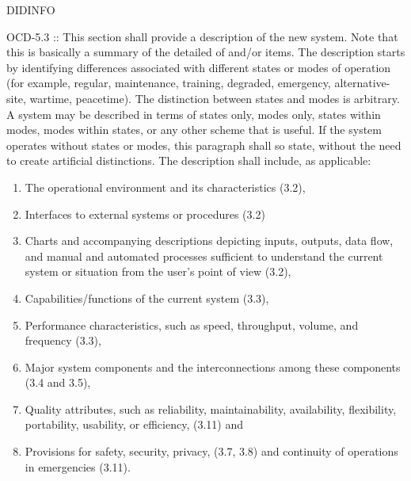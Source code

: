 
DIDINFO{OCD-5.3 :: This section shall provide a description of the new system.
Note that this is basically a summary of the detailed of \SPS and/or \SSS items. 
The description starts by identifying differences associated with different states or modes of operation (for example, regular, maintenance, training, degraded, emergency, alternative-site, wartime, peacetime). 
The distinction between states and modes is arbitrary. 
A system may be described in terms of states only, modes only, states within modes, modes within states, or any other scheme that is useful. 
If the system operates without states or modes, this paragraph shall so state, without the need to create artificial distinctions. 
The description shall include, as applicable:
\begin{enumerate}[itemindent=5pt,topsep=0pt,itemsep=0pt,partopsep=0pt, parsep=0pt, label=(\alph*)]
\item The operational environment and its characteristics (3.2),
\item Interfaces to external systems or procedures (3.2)
\item Charts and accompanying descriptions depicting inputs, outputs, data flow, and manual
and automated processes sufficient to understand the current system or situation from the
user’s point of view (3.2),
\item Capabilities/functions of the current system (3.3),
\item Performance characteristics, such as speed, throughput, volume, and frequency (3.3),
\item Major system components and the interconnections among these components (3.4 and 3.5),
\item Quality attributes, such as reliability, maintainability, availability, flexibility, portability,
usability, or efficiency, (3.11) and
\item Provisions for safety, security, privacy, (3.7, 3.8) and continuity of operations in emergencies (3.11).
\end{enumerate}
}